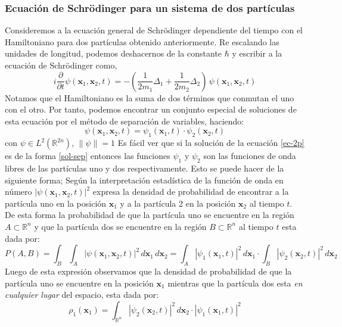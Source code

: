 \documentclass[12pt]{book}
\numberwithin{equation}{chapter}
\def\R{\mathbb{R}}
\def\x{\mathbf{x}}
\begin{document}
\subsubsection{Ecuaci\'on de Schr\"odinger para un sistema de dos part\'iculas}
Consideremos a la ecuaci\'on general de Schr\"odinger dependiente del tiempo con el Hamiltoniano para dos part\'iculas obtenido anteriormente. Re escalando las unidades de longitud, podemos deshacernos de la constante $\hbar$ y escribir a la ecuaci\'on de Schr\"odinger como,
\begin{equation}\label{ec-2p}
i \frac{\partial}{ \partial t } \psi (\x_{1} , \x_{2},t)= - \left( \frac{1}{2m_{1}} \Delta_{1} + \frac{1}{2m_{2}} \Delta_{2} \right) \, \psi (\x_{1},\x_{2},t) 
\end{equation}
Notamos que el Hamiltoniano es la suma de dos t\'erminos que conmutan el uno con el otro. Por tanto, podemos encontrar un conjunto especial de soluciones de esta ecuaci\'on por el m\'etodo de separaci\'on de variables, haciendo:
\begin{equation}\label{sol-sep}
\psi (\x_{1} , \x_{2},t) = \psi_{1} (\x_{1},t) \cdot \psi_{2} (\x_{2},t)
\end{equation}
con $\psi \in L^{2}(\R^{2n})$, $\|\psi\|=1$ 
Es f\'acil ver que si la soluci\'on de la ecuaci\'on \eqref{ec-2p} es de la forma \eqref{sol-sep} entonces las funciones $\psi_{1}$ y $\psi_{2}$ son las funciones de onda libres de las part\'iculas uno y dos respectivamente. Esto se puede hacer de la siguiente forma; Seg\'un la interpretaci\'on estad\'istica de la funci\'on de onda en n\'umero $|\psi(\x_{1} , \x_{2},t)|^{2}$ expresa la densidad de probabilidad de encontrar a la part\'icula uno en la posici\'on $\x_{1}$  y a la part\'icula 2 en la posici\'on $\x_{2}$ al tiempo $t$. De esta forma la probabilidad de que la part\'icula uno se encuentre en la regi\'on $A \subset \R^{n}$ y que la part\'icula dos se encuentre en la regi\'on $B \subset \R^{n}$ al tiempo $t$ esta dada por:
\begin{equation}
P(A,B)= \int_{B} \int_{A} |\psi(\x_{1} , \x_{2},t)|^{2} \, d\x_{1}\, d\x_{2}= \int_{A} |\psi_{1}(\x_{1},t)|^{2}\, d\x_{1} \cdot \int_{B} |\psi_{2}(\x_{2},t)|^{2}\, d\x_{2}
\end{equation}
Luego de esta expresi\'on observamos que la densidad de probabilidad de que la part\'icula uno se encuentre en la posici\'on $\x_{1}$ mientras que la part\'icula dos esta \emph{en cualquier lugar} del espacio, esta dada por:
\begin{equation}
\rho_{1}(\x_{1})= \int_{\R^{n}} |\psi_{2}(\x_{2},t)|^{2}\, d\x_{2} \cdot |\psi_{1}(\x_{1},t)|^{2} 
\end{equation}
\end{document}
